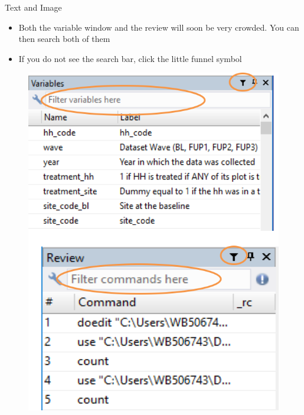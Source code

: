 \documentclass[aspectratio=169]{beamer}
\begin{document}
\begin{frame}[fragile]{Text and Image}

\begin{multicols}{2}	
	\begin{itemize}
		\item Both the variable window and the review will soon be very crowded. You can then search both of them
		\item If you do not see the search bar, click the little funnel symbol
		
	\end{itemize}
	\begin{figure}
		\centering
		\includegraphics[width=\linewidth]{img/review_window}
	\end{figure}
\end{multicols}
\end{frame}

\end{document}
